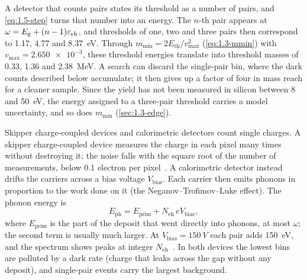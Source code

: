 A detector that counts pairs states its threshold as a number of pairs, and \cref{eq:1.5-step} turns that number into an energy. The $n$-th pair appears at $\omega = E_{\mathrm{g}} + (n-1)\varepsilon_{\mathrm{eh}}$, and thresholds of one, two and three pairs then correspond to 1.17, 4.77 and \SI{8.37}{eV}. Through $m_{\mathrm{min}} = 2E_{\mathrm{th}}/v_{\mathrm{max}}^2$ (\cref{eq:1.3-mmin}) with $v_{\mathrm{max}} = \num{2.650e-3}$, these threshold energies translate into threshold masses of 0.33, 1.36 and \SI{2.38}{MeV}. A search can discard the single-pair bin, where the dark counts described below accumulate; it then gives up a factor of four in mass reach for a cleaner sample. Since the yield has not been measured in silicon between 8 and \SI{50}{eV}, the energy assigned to a three-pair threshold carries a model uncertainty, and so does $m_{\mathrm{min}}$ (\cref{sec:1.3-edge}).

Skipper charge-coupled devices and calorimetric detectors count single charges. A skipper charge-coupled device measures the charge in each pixel many times without destroying it; the noise falls with the square root of the number of measurements, below 0.1 electron per pixel~\cite[Sect.~VII\,A]{kahn2022searches}. A calorimetric detector instead drifts the carriers across a bias voltage $V_{\mathrm{bias}}$. Each carrier then emits phonons in proportion to the work done on it (the Neganov--Trofimov--Luke effect). The phonon energy is~\cite[Eq.~(195)]{kahn2022searches}
\begin{equation}
  E_{\mathrm{ph}} = E_{\mathrm{prim}} + N_{\mathrm{eh}}\, e V_{\mathrm{bias}} ,
  \label{eq:1.5-luke}
\end{equation}
where $E_{\mathrm{prim}}$ is the part of the deposit that went directly into phonons, at most $\omega$; the second term is usually much larger.
At $V_{\mathrm{bias}} = \SI{150}{V}$ each pair adds \SI{150}{eV}, and the spectrum shows peaks at integer $N_{\mathrm{eh}}$~\cite[Sect.~VII\,A]{kahn2022searches}. In both devices the lowest bins are polluted by a dark rate (charge that leaks across the gap without any deposit), and single-pair events carry the largest background.

